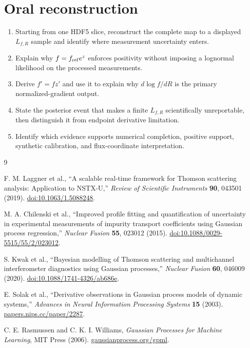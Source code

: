 \documentclass[10pt,twocolumn]{article}
\begin{document}
\section*{Oral reconstruction}

\begin{enumerate}
\item Starting from one HDF5 slice, reconstruct the complete map to a displayed
$L_{f,R}$ sample and identify where measurement uncertainty enters.
\item Explain why $f=f_{\rm ref}e^z$ enforces positivity without imposing a
lognormal likelihood on the processed measurements.
\item Derive $f'=fz'$ and use it to explain why $d\log f/dR$ is the primary
normalized-gradient output.
\item State the posterior event that makes a finite $L_{f,R}$ scientifically
unreportable, then distinguish it from endpoint derivative limitation.
\item Identify which evidence supports numerical completion, positive support,
synthetic calibration, and flux-coordinate interpretation.
\end{enumerate}

\begin{thebibliography}{9}
\footnotesize
\setlength{\itemsep}{1pt}
\setlength{\parsep}{0pt}

F. M. Laggner et al., ``A scalable real-time framework for Thomson scattering
analysis: Application to NSTX-U,'' \emph{Review of Scientific Instruments}
\textbf{90}, 043501 (2019).
\href{https://doi.org/10.1063/1.5088248}{doi:10.1063/1.5088248}.

M. A. Chilenski et al., ``Improved profile fitting and quantification of
uncertainty in experimental measurements of impurity transport coefficients
using Gaussian process regression,'' \emph{Nuclear Fusion} \textbf{55},
023012 (2015).
\href{https://doi.org/10.1088/0029-5515/55/2/023012}{doi:10.1088/0029-5515/55/2/023012}.

S. Kwak et al., ``Bayesian modelling of Thomson scattering and multichannel
interferometer diagnostics using Gaussian processes,'' \emph{Nuclear Fusion}
\textbf{60}, 046009 (2020).
\href{https://doi.org/10.1088/1741-4326/ab686e}{doi:10.1088/1741-4326/ab686e}.

E. Solak et al.,
``Derivative observations in Gaussian process models of dynamic systems,''
\emph{Advances in Neural Information Processing Systems} \textbf{15} (2003).
\href{https://papers.nips.cc/paper/2287-derivative-observations-in-gaussian-process-models-of-dynamic-systems}{papers.nips.cc/paper/2287}.

C. E. Rasmussen and C. K. I. Williams, \emph{Gaussian Processes for Machine
Learning}, MIT Press (2006).
\href{https://gaussianprocess.org/gpml/}{gaussianprocess.org/gpml}.

\end{thebibliography}
\end{document}
